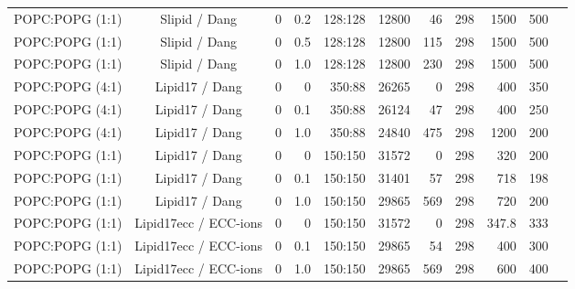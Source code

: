 \documentclass[aps,prl,superscriptaddress,twocolumn]{revtex4}
\begin{document}
\begin{table*}[htb]
\begin{minipage}[t]{\textwidth}
\begin{tabular}{l c c r r r r r r c c}
      POPC:POPG (1:1)        & Slipid / Dang \cite{jambeck12b,jambeck2012another,smith94,dang06} & 0         & 0.2  & 128:128 & 12800 & 46  &  298  & 1500 & 500 & \cite{slipidPOPC50POPG50T298K} \\
      POPC:POPG (1:1)        & Slipid / Dang \cite{jambeck12b,jambeck2012another,smith94,dang06} & 0         & 0.5  & 128:128 & 12800 & 115 &  298  & 1500 & 500 & \cite{slipidPOPC50POPG50T298K} \\
      POPC:POPG (1:1)        & Slipid / Dang \cite{jambeck12b,jambeck2012another,smith94,dang06} & 0         & 1.0  & 128:128 & 12800 & 230 &  298  & 1500 & 500 & \cite{slipidPOPC50POPG50T298K} \\
      
      \hline
      POPC:POPG (4:1)        & Lipid17 / Dang \cite{gould18,smith94,dang06}        &0          & 0  & 350:88 & 26265 & 0  &  298  & 400 & 350 & \cite{Lipid17POPCPOPG8020} \\
      POPC:POPG (4:1)        & Lipid17 / Dang \cite{gould18,smith94,dang06}        &0          & 0.1& 350:88 & 26124 & 47 &  298  & 400 & 250 & \cite{Lipid17POPCPOPG8020100mMCaCl} \\
      POPC:POPG (4:1)        & Lipid17 / Dang \cite{gould18,smith94,dang06}        &0          & 1.0& 350:88 & 24840 & 475 &  298  & 1200 & 200 & \cite{Lipid17POPCPOPG80201000mMCaCl} \\
      POPC:POPG (1:1)        & Lipid17 / Dang \cite{gould18,smith94,dang06}        &0          & 0  & 150:150 & 31572 & 0  &  298  & 320 & 200 & \cite{Lipid17POPCPOPG5050} \\
      POPC:POPG (1:1)        & Lipid17 / Dang \cite{gould18,smith94,dang06}        &0          & 0.1& 150:150 & 31401 & 57 &  298  & 718 & 198 & \cite{Lipid17POPCPOPG5050100mMCaCl} \\
      POPC:POPG (1:1)        & Lipid17 / Dang \cite{gould18,smith94,dang06}        &0          & 1.0& 150:150 & 29865 & 569 &  298  & 720 & 200 & \cite{Lipid17POPCPOPG50501000mMCaCl} \\
      \hline
      POPC:POPG (1:1)        & Lipid17ecc / ECC-ions \cite{pluharova14,kohagen16,martinek18}     &0          & 0  & 150:150 & 31572 & 0  &  298  & 347.8 & 333 & \cite{Lipid17eccPOPCPOPG5050} \\
      POPC:POPG (1:1)        & Lipid17ecc / ECC-ions \cite{pluharova14,kohagen16,martinek18}     &0          & 0.1& 150:150 & 29865 & 54 &  298  & 400 & 300 & \cite{Lipid17eccPOPCPOPG5050100mMCaCl} \\
      POPC:POPG (1:1)        & Lipid17ecc / ECC-ions \cite{pluharova14,kohagen16,martinek18}     &0          & 1.0& 150:150 & 29865 & 569 &  298  & 600 & 400 & \cite{Lipid17eccPOPCPOPG50501000mMCaCl} \\

\end{tabular}
\end{minipage}
\end{table*}
\end{document}
